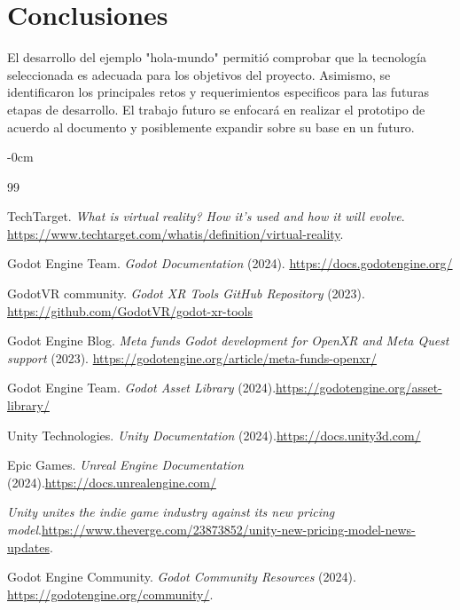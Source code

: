 \documentclass[journal,article,accept,pdftex,moreauthors]{Definitions/mdpi}
\begin{document}
\section{Conclusiones}
El desarrollo del ejemplo "hola-mundo" permitió comprobar que la tecnología seleccionada es adecuada para los objetivos del proyecto. Asimismo, se identificaron los principales retos y requerimientos especificos para las futuras etapas de desarrollo. El trabajo futuro se enfocará en realizar el prototipo de acuerdo al documento y posiblemente expandir sobre su base en un futuro.

\begin{adjustwidth}{-\extralength}{0cm}

\begin{thebibliography}{99}

TechTarget. \textit{What is virtual reality? How it's used and how it will evolve}. \url{https://www.techtarget.com/whatis/definition/virtual-reality}.

    Godot Engine Team. \textit{Godot Documentation} (2024). \url{https://docs.godotengine.org/}

GodotVR community. \textit{Godot XR Tools GitHub Repository} (2023). \url{https://github.com/GodotVR/godot-xr-tools}

Godot Engine Blog. \textit{Meta funds Godot development for OpenXR and Meta Quest support} (2023). \url{https://godotengine.org/article/meta-funds-openxr/}

Godot Engine Team. \textit{Godot Asset Library} (2024).\url{https://godotengine.org/asset-library/}

Unity Technologies. \textit{Unity Documentation} (2024).\url{https://docs.unity3d.com/}

Epic Games. \textit{Unreal Engine Documentation} (2024).\url{https://docs.unrealengine.com/}

  \textit{Unity unites the indie game industry against its new pricing model}.\url{https://www.theverge.com/23873852/unity-new-pricing-model-news-updates}.

Godot Engine Community. \textit{Godot Community Resources} (2024). \url{https://godotengine.org/community/}.

\end{thebibliography}
\end{adjustwidth}

\PublishersNote{}
\end{document}
